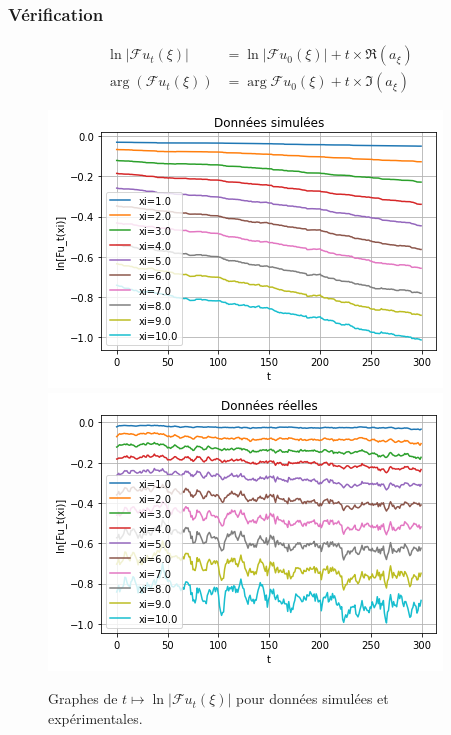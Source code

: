 \documentclass{beamer}
\newcommand{\pth}[1]{\left(#1\right)}
\newcommand{\abs}[1]{\left|#1\right|}
\newcommand{\fr}{\mathcal{F}}
\begin{document}
\begin{frame}
  \frametitle{Vérification}
  
\begin{align*}
  \ln\abs{\fr u_t(\xi)}&=\ln\abs{\fr u_0(\xi)}+t\times\Re(a_{\xi})\\
  \arg\pth{\fr u_t(\xi)}&=\arg{\fr u_0(\xi)}+t\times\Im(a_{\xi})
\end{align*}
\pause

\vspace{0.3cm}
\begin{figure}
  
\includegraphics[scale=0.4]{img/proj_non_norm_sim}
\includegraphics[scale=0.4]{img/proj_non_norm_rea}
  \caption{Graphes de $t\mapsto \ln\abs{\fr u_t(\xi)}$ pour données simulées et expérimentales.}
  
\end{figure}


\end{frame}
\end{document}
